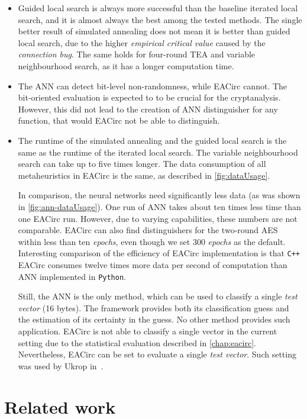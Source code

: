 \documentclass[
    digital,    %
    oneside,    %
    color,
    11pt,
    nocover,
    notable,
    nolof,
    nolot,
]{fithesis3}
\begin{document}
\begin{itemize}
    \item Guided local search is always more successful than the baseline iterated local search, and it is almost always the best among the tested methods. The single better result of simulated annealing does not mean it is better than guided local search, due to the higher \textit{empirical critical value} caused by the \textit{connection bug}. The same holds for four-round TEA and variable neighbourhood search, as it has a longer computation time.
    \item The ANN can detect bit-level non-randomness, while EACirc cannot. The bit-oriented evaluation is expected to to be crucial for the cryptanalysis. However, this did not lead to the creation of ANN distinguisher for any function, that would EACirc not be able to distinguish.
    \item The runtime of the simulated annealing and the guided local search is the same as the runtime of the iterated local search. The variable neighbourhood search can take up to five times longer. The data consumption of all metaheuristics in EACirc is the same, as described in \cref{fig:dataUsage}.
    
    In comparison, the neural networks need significantly less data (as was shown in \cref{fig:ann-dataUsage}). One run of ANN takes about ten times less time than one EACirc run. However, due to varying capabilities, these numbers are not comparable. EACirc can also find distinguishers for the two-round AES within less than ten \textit{epochs}, even though we set 300 \textit{epochs} as the default. Interesting comparison of the efficiency of EACirc implementation is that \texttt{C++} EACirc consumes twelve times more data per second of computation than ANN implemented in \texttt{Python}.
    
    Still, the ANN is the only method, which can be used to classify a single \textit{test vector} (16 bytes). The framework provides both its classification guess and the estimation of its certainty in the guess. No other method provides such application. EACirc is not able to classify a single vector in the current setting due to the statistical evaluation described in \cref{chap:eacirc}. Nevertheless, EACirc can be set to evaluate a single \textit{test vector}. Such setting was used by Ukrop in~\cite{ukropBcThesis}.
\end{itemize}

\chapter{Related work}
\label{chap:relatwork}
\end{document}
